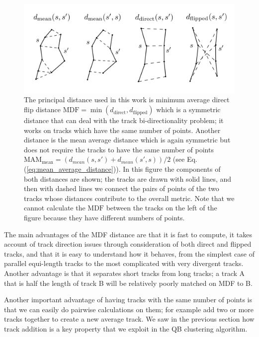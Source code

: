 \documentclass[preprint,authoryear,a4paper,10pt,onecolumn]{elsarticle}
\begin{document}
\begin{figure}
\includegraphics[scale=0.5]{Fig_2_distances2}
\centering{}
\caption{The principal distance used in this work is minimum average direct flip
distance $\textrm{MDF}=\min(d_{\textrm{direct}},d_{\textrm{flipped}})$ which is
a symmetric distance that can deal with the track bi-directionality problem; it
works on tracks which have the same number of points.  Another distance is the
mean average distance which is again symmetric but does not require the tracks
to have the same number of points
$\textrm{MAM}_{\textrm{mean}}=(d_{mean}(s,s')+d_{mean}(s',s))/2$ (see Eq.
(\ref{eq:mean_average_distance})).  In this figure the components of both
distances are shown; the tracks are drawn with solid lines, and then with dashed
lines we connect the pairs of points of the two tracks whose distances
contribute to the overall metric. Note that we cannot calculate the
$\textrm{MDF}$ between the tracks on the left of the figure because they have
different numbers of points.
\label{Flo:Distances_used}}
\end{figure}

The main advantages of the MDF distance are that it is fast to compute,
it takes account of track direction issues through consideration of both
direct and flipped tracks, and that it is easy to understand how it
behaves, from the simplest case of parallel equi-length tracks to the
most complicated with very divergent tracks. Another advantage is that
it separates short tracks from long tracks; a track A that is half the length of
track B will be relatively poorly matched on MDF to B.  

Another important advantage of having tracks with the same number of points is
that we can easily do pairwise calculations on them; for example add two or more
tracks together to create a new average track. We saw in the previous section
how track addition is a key property that we exploit in the QB clustering
algorithm.
\end{document}
